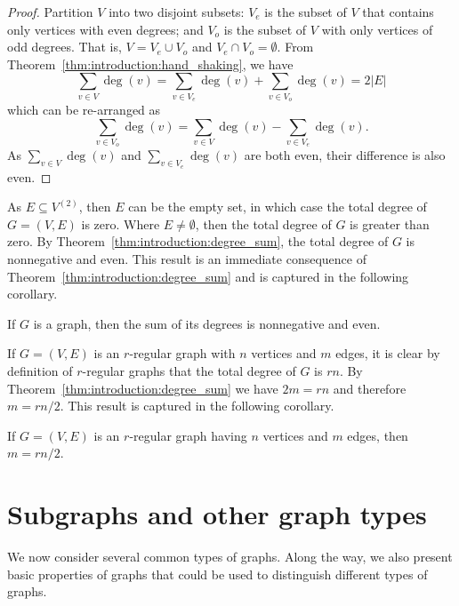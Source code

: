 \begin{proof}
Partition $V$ into two disjoint subsets: $V_e$ is the subset of $V$
that contains only vertices with even degrees; and $V_o$ is the subset
of $V$ with only vertices of odd degrees. That is, $V = V_e \cup V_o$
and $V_e \cap V_o = \emptyset$. From
Theorem~\ref{thm:introduction:hand_shaking}, we have
\[
\sum_{v \in V} \deg(v)
=
\sum_{v \in V_e} \deg(v) + \sum_{v \in V_o} \deg(v)
=
2 |E|
\]
which can be re-arranged as
\[
\sum_{v \in V_o} \deg(v)
=
\sum_{v \in V} \deg(v) - \sum_{v \in V_e} \deg(v).
\]
As $\sum_{v \in V} \deg(v)$ and $\sum_{v \in V_e} \deg(v)$ are both
even, their difference is also even.
\end{proof}

As $E \subseteq V^{(2)}$, then $E$ can be the empty set, in which
case the total degree of $G = (V, E)$ is zero. Where $E \neq
\emptyset$, then the total degree of $G$ is greater than zero. By
Theorem~\ref{thm:introduction:degree_sum}, the total degree of $G$ is
nonnegative and even. This result is an immediate consequence of
Theorem~\ref{thm:introduction:degree_sum} and is captured in the
following corollary.

\begin{corollary}
\label{cor:introduction:degree_sum_even}
If $G$ is a graph, then the sum of its degrees is nonnegative
and even.
\end{corollary}

If $G = (V, E)$ is an $r$-regular graph with $n$ vertices and $m$
edges, it is clear by definition of $r$-regular graphs that the total
degree of $G$ is $rn$. By Theorem~\ref{thm:introduction:degree_sum} we
have $2m = rn$ and therefore $m = rn / 2$. This result is captured in
the following corollary.

\begin{corollary}
If $G = (V, E)$ is an $r$-regular graph having $n$ vertices and $m$
edges, then $m = rn / 2$.
\end{corollary}



\section{Subgraphs and other graph types}
\label{sec:introduction:subgraphs_graph_types}

We now consider several common types of graphs. Along the way, we also
present basic properties of graphs that could be used to distinguish
different types of graphs.


